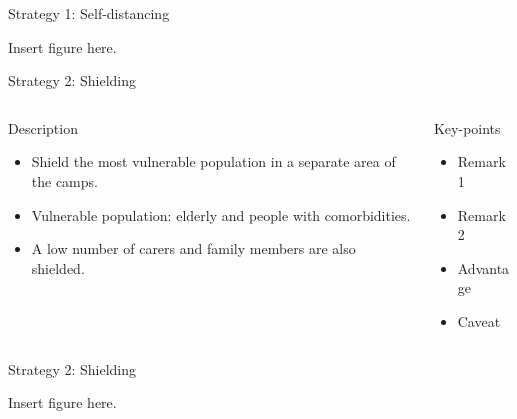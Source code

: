 \documentclass[12pt,handout]{beamer}
\begin{document}
\begin{frame}{Strategy 1: Self-distancing}

Insert figure here.

\end{frame}

\begin{frame}{Strategy 2: Shielding}

    \begin{columns}[t]
        \begin{column}{.5\textwidth}
        \begin{block}{Description}
        \begin{itemize}
            \item Shield the most vulnerable population in a separate area of the camps.
            \item Vulnerable population: elderly and people with comorbidities.
            \item A low number of carers and family members are also shielded.
            
        \end{itemize}
        \end{block}
        \end{column}
        \begin{column}{.5\textwidth}
            \begin{block}{Key-points}
            \begin{itemize}
                \item Remark 1
                \item Remark 2
                \item Advantage
                \item Caveat
            \end{itemize}
            \end{block}
        \end{column}
    \end{columns}

\end{frame}

\begin{frame}{Strategy 2: Shielding}

Insert figure here.

\end{frame}
\end{document}
